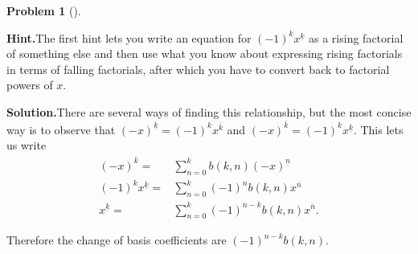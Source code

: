 \documentclass[10pt,]{book}
\theoremstyle{plain}
\theoremstyle{definition}
\newtheorem{activity}[project]{Problem}
\theoremstyle{definition}
\numberwithin{equation}{chapter}
\newcommand{\amp}{&}
\begin{document}
\begin{activity}[]
\begin{enumerate}[font=\bfseries,label=(\alph*),ref=\alph*]
\par\medskip\noindent%
\textbf{Hint.}\quad The first hint lets you write an equation for \((-1)^k x^{\underline{k}}\) as a rising factorial of something else and then use what you know about expressing rising factorials in terms of falling factorials, after which you have to convert back to factorial powers of \(x\).%
\par\medskip\noindent%
\textbf{Solution.}\quad There are several ways of finding this relationship, but the most concise way is to observe that \((-x)^{\underline{k}}=(-1)^kx^{\overline{k}}\) and \((-x)^{\overline{k}}= (-1)^k x^{\underline{k}}\). This lets us write%
\begin{align*}
(-x)^{\overline{k}} =\amp \sum_{n=0}^k
b(k,n)(-x)^{\underline{n}}\\
(-1)^kx^{\underline{k}} =\amp \sum_{n=0}^k(-1)^nb(k,n)x^{\overline{n}}\\
x^{\underline{k}} =\amp \sum_{n=0}^k (-1)^{n-k}b(k,n)x^{\overline{n}}.
\end{align*}
%
\par
Therefore the change of basis coefficients are \((-1)^{n-k}b(k,n)\).%
\end{enumerate}
\end{activity}
\typeout{************************************************}
\typeout{************************************************}
\end{document}
